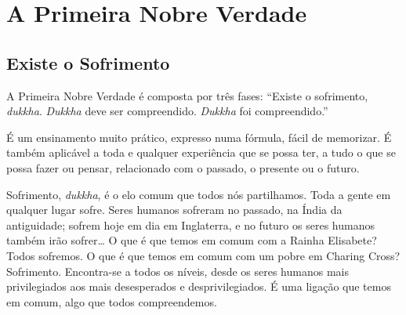 
\chapter{A Primeira Nobre Verdade}

\section{Existe o Sofrimento}

A Primeira Nobre Verdade é composta por três fases: “Existe o sofrimento,
\emph{dukkha}. \emph{Dukkha} deve ser compreendido. \emph{Dukkha} foi
compreendido.”

É um ensinamento muito prático, expresso numa fórmula, fácil de memorizar. É
também aplicável a toda e qualquer experiência que se possa ter, a tudo o que se
possa fazer ou pensar, relacionado com o passado, o presente ou o futuro.

Sofrimento, \emph{dukkha}, é o elo comum que todos nós partilhamos. Toda a gente
em qualquer lugar sofre. Seres humanos sofreram no passado, na Índia da
antiguidade; sofrem hoje em dia em Inglaterra, e no futuro os seres humanos
também irão sofrer\ldots{} O que é que temos em comum com a Rainha Elisabete?
Todos sofremos. O que é que temos em comum com um pobre em Charing Cross?
Sofrimento. Encontra-se a todos os níveis, desde os seres humanos mais
privilegiados aos mais desesperados e desprivilegiados. É uma ligação que temos
em comum, algo que todos compreendemos.

